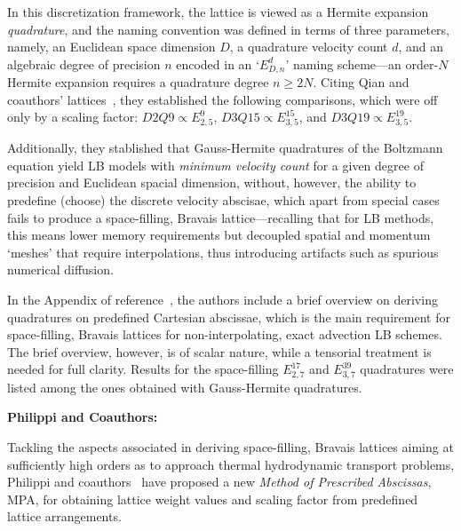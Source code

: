     In this discretization framework, the lattice is viewed as a Hermite expansion \emph{quadrature}, and the naming  convention
    was defined in terms of three parameters, namely, an Euclidean space dimension $D$, a quadrature velocity count $d$, and  an
    algebraic degree of precision $n$ encoded in an `$E_{D,n}^{d}$' naming scheme---an order-$N$ Hermite  expansion  requires  a
    quadrature degree $n \geqslant 2N$. Citing Qian  and  coauthors'  lattices~\cite{1992-QianYH+LallemandP-EuroPhysLett},  they
    established the following comparisons, which were off only by a scaling factor: $D2Q9 \propto E_{2,5}^{9}$,  $D3Q15  \propto
    E_{3,5}^{15}$, and $D3Q19 \propto E_{3,5}^{19}$.

    Additionally, they stablished that Gauss-Hermite quadratures of the Boltzmann equation yield LB  models  with  \emph{minimum
    velocity count} for a given degree of precision and Euclidean spacial dimension, without, however, the ability to  predefine
    (choose) the discrete velocity abscisae,  which  apart  from  special  cases  fails  to  produce  a  space-filling,  Bravais
    lattice---recalling that for LB methods, this means lower memory requirements but decoupled spatial  and  momentum  `meshes'
    that require interpolations, thus introducing artifacts such as spurious numerical diffusion.

    In the  Appendix  of  reference~\cite{2006-ShanX+ChenH-JFluidMech},  the  authors  include  a  brief  overview  on  deriving
    quadratures on predefined Cartesian abscissae, which is  the  main  requirement  for  space-filling,  Bravais  lattices  for
    non-interpolating, exact advection LB schemes. The brief overview, however, is of scalar nature, while a tensorial treatment
    is needed for full clarity. Results for the space-filling $E_{2,7}^{17}$ and $E_{3,7}^{39}$ quadratures  were  listed  among
    the ones obtained with Gauss-Hermite quadratures.


    \vspace{2.0mm}\noindent\textbf{Philippi and Coauthors:}\vspace{1.0mm}

    Tackling the aspects associated in deriving space-filling, Bravais  lattices  aiming  at  sufficiently  high  orders  as  to
    approach thermal hydrodynamic  transport  problems,  Philippi  and  coauthors~\cite{2006-PhilippiPC+SurmasR-PhysRevE}  have
    proposed a new \emph{Method of Prescribed Abscissas\/}, MPA, for obtaining lattice weight values  and  scaling  factor  from
    predefined lattice arrangements.


